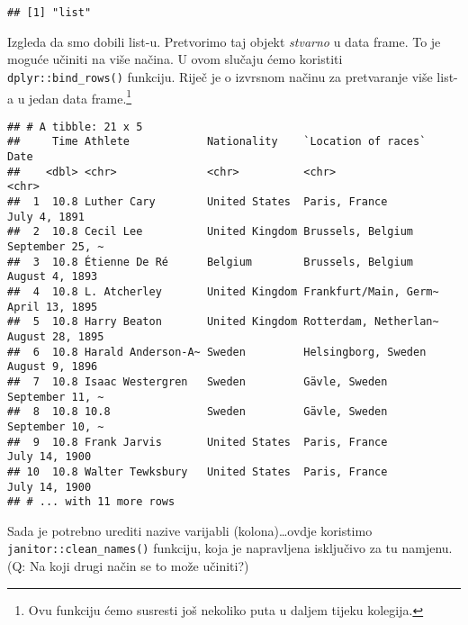 \documentclass[
]{article}
\newenvironment{Shaded}{\begin{snugshade}}{\end{snugshade}}
\newcommand{\CommentTok}[1]{\textcolor[rgb]{0.56,0.35,0.01}{\textit{#1}}}
\newcommand{\KeywordTok}[1]{\textcolor[rgb]{0.13,0.29,0.53}{\textbf{#1}}}
\newcommand{\NormalTok}[1]{#1}
\newcommand{\OperatorTok}[1]{\textcolor[rgb]{0.81,0.36,0.00}{\textbf{#1}}}
\newcommand{\StringTok}[1]{\textcolor[rgb]{0.31,0.60,0.02}{#1}}
\begin{document}
\begin{verbatim}
## [1] "list"
\end{verbatim}

Izgleda da smo dobili list-u. Pretvorimo taj objekt \emph{stvarno} u
data frame. To je moguće učiniti na više načina. U ovom slučaju ćemo
koristiti \texttt{dplyr::bind\_rows()} funkciju. Riječ je o izvrsnom
načinu za pretvaranje više list-a u jedan data frame.\footnote{Ovu
  funkciju ćemo susresti još nekoliko puta u daljem tijeku kolegija.}

\begin{Shaded}
\end{Shaded}

\begin{verbatim}
## # A tibble: 21 x 5
##     Time Athlete            Nationality    `Location of races`   Date           
##    <dbl> <chr>              <chr>          <chr>                 <chr>          
##  1  10.8 Luther Cary        United States  Paris, France         July 4, 1891   
##  2  10.8 Cecil Lee          United Kingdom Brussels, Belgium     September 25, ~
##  3  10.8 Étienne De Ré      Belgium        Brussels, Belgium     August 4, 1893 
##  4  10.8 L. Atcherley       United Kingdom Frankfurt/Main, Germ~ April 13, 1895 
##  5  10.8 Harry Beaton       United Kingdom Rotterdam, Netherlan~ August 28, 1895
##  6  10.8 Harald Anderson-A~ Sweden         Helsingborg, Sweden   August 9, 1896 
##  7  10.8 Isaac Westergren   Sweden         Gävle, Sweden         September 11, ~
##  8  10.8 10.8               Sweden         Gävle, Sweden         September 10, ~
##  9  10.8 Frank Jarvis       United States  Paris, France         July 14, 1900  
## 10  10.8 Walter Tewksbury   United States  Paris, France         July 14, 1900  
## # ... with 11 more rows
\end{verbatim}

Sada je potrebno urediti nazive varijabli (kolona)\ldots ovdje koristimo
\texttt{janitor::clean\_names()} funkciju, koja je napravljena
isključivo za tu namjenu. (Q: Na koji drugi način se to može učiniti?)
\end{document}
